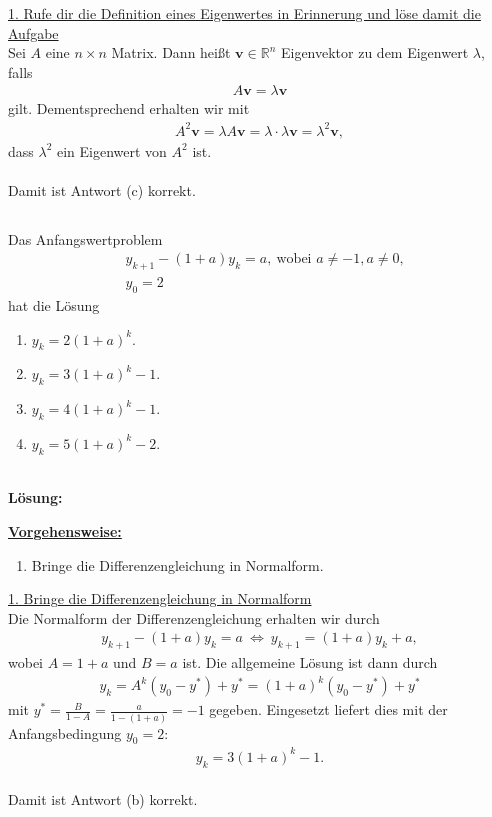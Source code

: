 \underline{1. Rufe dir die Definition eines Eigenwertes in Erinnerung und löse damit die Aufgabe}\\
Sei $ A $ eine $ n \times n$ Matrix. Dann heißt  $ \textbf{v} \in \mathbb{R}^n $ Eigenvektor zu dem Eigenwert $ \lambda $, falls
\begin{align*}
A \textbf{v} = \lambda \textbf{v}
\end{align*}
gilt. Dementsprechend erhalten wir mit
\begin{align*}
A^2 \textbf{v} = \lambda  A \textbf{v} = \lambda \cdot \lambda   \textbf{v}= \lambda^2 \textbf{v}, 
\end{align*}
dass $ \lambda^2$ ein Eigenwert von $ A^2 $ ist.\\
\\
Damit ist Antwort (c) korrekt.



\newpage

\subsection*{}
Das Anfangswertproblem
\begin{align*}
&y_{k+1} -(1+a) y_k = a, \ \textrm{wobei } a \neq -1, a \neq 0,\\
&y_0 = 2
\end{align*}
hat die Lösung
\renewcommand{\labelenumi}{(\alph{enumi})}
\begin{enumerate}
	\item 
	$ y_k = 2 ( 1+a)^k $.
	\item
	$ y_k = 3 ( 1+a)^k  -1$.
	\item
	$ y_k = 4 ( 1+a)^k -1 $.
	\item
	$ y_k = 5 ( 1+a)^k -2$.
\end{enumerate}
\ \\
\textbf{Lösung:}
\begin{mdframed}
\underline{\textbf{Vorgehensweise:}}
\renewcommand{\labelenumi}{\theenumi.}
\begin{enumerate}
\item  Bringe die Differenzengleichung in Normalform.
\end{enumerate}
\end{mdframed}

\underline{1. Bringe die Differenzengleichung in Normalform}\\
Die Normalform der Differenzengleichung erhalten wir durch
\begin{align*}
y_{k+1} -(1+a) y_k = a
\ \Leftrightarrow \
y_{k+1}
= (1+a ) y_k + a,
\end{align*}
wobei $ A = 1+a $ und $ B = a $ ist.
Die allgemeine Lösung ist dann durch
\begin{align*}
y_k = A^k(y_0 - y^\ast) + y^\ast =(1+a)^k(y_0 - y^\ast) + y^\ast
\end{align*}
mit $ y^\ast = \frac{B}{1- A} =\frac{a}{1-(1+a)} = -1 $ gegeben.
Eingesetzt liefert dies mit der Anfangsbedingung $ y_0 = 2 $:
\begin{align*}
y_k = 3 (1+a)^k -1.
\end{align*}
\ \\
Damit ist Antwort (b) korrekt.\\
\\

